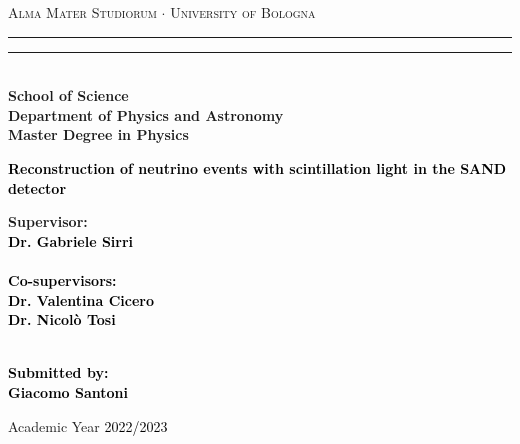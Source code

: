 \begin{center}
{{\Large{\textsc{Alma Mater Studiorum $\cdot$ University of  Bologna}}}} 
\rule[0.1cm]{15cm}{0.1mm}
\rule[0.5cm]{15cm}{0.6mm}
\\\vspace{3mm}
{\small{\bf School of Science \\
Department of Physics and Astronomy\\
Master Degree in Physics}}
\end{center}
\vspace{40mm}
\begin{center}\textcolor{black}{
{\LARGE{\bf Reconstruction of neutrino events with scintillation light in the SAND detector\\}}
}\end{center}
\vspace{50mm} \par \noindent
\begin{minipage}[t]{0.47\textwidth}
{\large{\bf Supervisor: \vspace{2mm}\\\textcolor{black}{
Dr. Gabriele Sirri}\\\\
\textcolor{black}{
\bf Co-supervisors:
\vspace{2mm}\\
Dr. Valentina Cicero\\
Dr. Nicolò Tosi\\\\}}}
\end{minipage}
%
\hfill
%
\begin{minipage}[t]{0.47\textwidth}\raggedleft \textcolor{black}{
{\large{\bf Submitted by:
\vspace{2mm}\\
\textcolor{black}{
Giacomo Santoni}}}
}
\end{minipage}
\vspace{40mm}
\begin{center}
Academic Year \textcolor{black}{2022/2023}
\end{center}